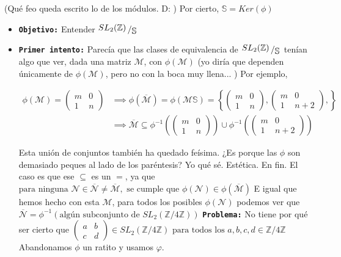 \documentclass{article}
\newcommand\tab[1][0.6cm]{\hspace*{#1}}
\newcommand\nl{\newline\tab}
\newcommand{\bigslant}[2]{{\raisebox{.2em}{$#1$}\left/\raisebox{-.2em}{$#2$}\right.}}
\begin{document}
	(Qué feo queda escrito lo de los módulos. D: ) \newline
	Por cierto, $\mathbb{S} = Ker(\phi)$
	\begin{itemize}
		\item \textbf{\texttt {Objetivo:}} Entender 
		$ \bigslant{SL_2(\mathbb{Z})}{\mathbb{S}}$ \nl
		\item \textbf{\texttt {Primer intento:}} Parecía que las clases de equivalencia de $ \bigslant{SL_2(\mathbb{Z})}{\mathbb{S}}$ tenían algo que ver, dada una matriz $\mathcal{M}$, con $\phi(\mathcal{M})$  (yo diría que dependen únicamente de $\phi(\mathcal{M})$, pero no con la boca muy llena... ) Por ejemplo, %
		
		\begin{align*}
		\phi(\mathcal{M}) = 
		\begin{pmatrix}
		m & 0 \\
		1 & n 
		\end{pmatrix} & \implies
		\phi(\overline{\mathcal{M}}) = 
		\phi(\mathcal{M}\mathbb{S}) = \left\{
		\begin{pmatrix}
		m & 0 \\
		1 & n 
		\end{pmatrix},
		\begin{pmatrix}
		m & 0 \\
		1 & n+2 
		\end{pmatrix},
		\right\}	\\			
		& \implies \overline{\mathcal{M}} \subseteq 
		 \phi^{-1}\left( 
		 \begin{pmatrix}
		 m & 0 \\
		 1 & n 
		 \end{pmatrix}
		  \right) 
		 \cup
		 \phi^{-1}\left( 
		 \begin{pmatrix}
		 m & 0 \\
		 1 & n+2 
		 \end{pmatrix}
		 \right)%
		 \end{align*}
		 
		 \tab Esta unión de conjuntos también ha quedado feísima.\nl 
		 ¿Es porque las $\phi$ son demasiado peques al lado de los paréntesis? Yo qué sé. Estética. \nl En fin.\nl 
		  El caso es que ese $\subseteq $ es un $=$, ya que 
		 $\text{para ninguna } \mathcal{N} \in \overline{\mathcal{N}} \neq \overline{\mathcal{M}} , \text{ se cumple que }\phi(\mathcal{N}) \in \phi(\overline{\mathcal{M}})$ \nl
		 E igual que hemos hecho con esta $\mathcal{M}$, para todos los posibles $\phi(\mathcal{N})$ podemos ver que $ \overline{\mathcal{N}}  = \phi^{-1}\left( \text{algún subconjunto de } SL_2(\mathbb{Z}/ 4\mathbb{Z}) \right)$ \nl\nl
		 \textbf{\texttt {Problema:}} No tiene por qué ser cierto que $
		 \begin{pmatrix}
		 a & b \\
		 c & d 
		 \end{pmatrix} \in SL_2(\mathbb{Z}/ 4\mathbb{Z}) \text{ para todos los } a,b,c,d \in \mathbb{Z}/ 4\mathbb{Z}
		 $ Abandonamos $\phi$ un ratito y usamos $\varphi$.
		 

\end{itemize}
\end{document}
